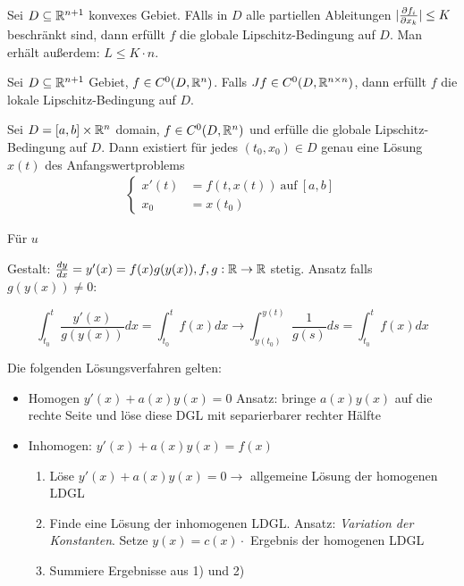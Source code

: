 \begin{satz}
	Sei $D \subseteq \mathbb{R}^{n+1}$ konvexes Gebiet. FAlls in $D$ alle partiellen Ableitungen $|\frac{\partial f_i}{\partial x_k}| \leq K$ beschränkt sind, dann erfüllt $f$ die globale Lipschitz-Bedingung auf $D$. Man erhält außerdem: $L \leq K \cdot n$.
	
	Sei $D \subseteq \mathbb{R}^{n+1}$ Gebiet, $f \in C^{0}(D,\mathbb{R}^n)$. Falls $Jf \in C^{0}(D,\mathbb{R}^{n \times n})$, dann erfüllt $f$ die lokale Lipschitz-Bedingung auf $D$.
\end{satz}

\begin{satz}
	Sei $D = [a,b] \times \mathbb{R}^n$ domain, $f \in C^{0}(D,\mathbb{R}^n)$ und erfülle die globale Lipschitz-Bedingung auf $D$. Dann existiert für jedes $(t_0, x_0) \in D$ genau eine Lösung $x(t)$ des Anfangswertproblems 
	\begin{align*}
		\begin{cases}
			x'(t) &= f(t,x(t)) \medspace \text{auf} \medspace [a,b] \\
			x_0 &= x(t_0)
		\end{cases}
	\end{align*}
\end{satz}

\begin{definition}
	Für $u$
\end{definition}

\begin{satz}
	
	Gestalt: $\frac{d y}{d x} = y'(x) = f(x)g(y(x)), f,g : \mathbb{R} \rightarrow \mathbb{R}$ stetig. Ansatz falls $g(y(x)) \neq 0$:
	
	\begin{equation*}
		\int_{t_0}^{t} \frac{y'(x)}{g(y(x))} dx = \int_{t_0}^{t} f(x) dx \rightarrow \int_{y(t_0)}^{y(t)} \frac{1}{g(s)} ds = \int_{t_0}^{t} f(x) dx
	\end{equation*}
\end{satz}


\begin{satz}
	Die folgenden Lösungsverfahren gelten:
	\begin{itemize}
		\item Homogen $y'(x) + a(x)y(x) = 0$ Ansatz: bringe $a(x)y(x)$ auf die rechte Seite und löse diese DGL mit separierbarer rechter Hälfte
		\item Inhomogen: $y'(x) + a(x)y(x) = f(x)$ 
			\begin{enumerate} [noitemsep]
				\item Löse $y'(x) +a(x)y(x) = 0 \rightarrow $ allgemeine Lösung der homogenen LDGL
				\item Finde eine Lösung der inhomogenen LDGL. Ansatz: \emph{Variation der Konstanten}. Setze $y(x) = c(x) \cdot$ Ergebnis der homogenen LDGL
				\item Summiere Ergebnisse aus 1) und 2)
			\end{enumerate}
	\end{itemize}
\end{satz}

